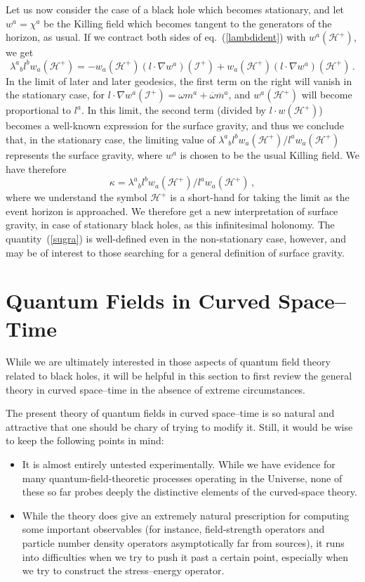 \documentclass[
%
draft    %
,numberedheadings 
,bibliocites
  ]
  {aipproc}
\newcommand{\scrif}{{{\mathscr I}^{+}}}
\newcommand{\Hf}{{{\mathscr H}^{+}}} %
\begin{document}
Let us now consider the case of a black hole which becomes stationary, and let $w^a=\chi ^a$ be the
Killing field which becomes tangent to the generators of the horizon, as usual.  If we contract both sides of eq.~(\ref{lambdident}) with $w^a(\Hf )$, we get
\begin{equation}\label{sugra}
 \lambda ^a{}_bl^bw_a(\Hf )=-w_a(\Hf )(l\cdot \nabla w^a )(\scrif ) 
  +w_a(\Hf )(l\cdot \nabla w^a)(\Hf )\, .
\end{equation}
In the limit of later and later geodesics, the first term on the right will vanish in the stationary case, for $l\cdot\nabla w^a (\scrif ) =\omega m^a+\overline\omega {\overline m}^a$, and $w^a(\Hf )$ will become proportional to $l^a$.  In this limit, the second term (divided by $l\cdot w(\Hf )$) becomes a well-known expression for the surface gravity, and thus we conclude that, in the stationary case, the limiting value of $ \lambda ^a{}_bl^bw_a(\Hf ) /l^aw_a(\Hf )$ represents the surface gravity, where $w^a$ is chosen to be the usual Killing field.  We have therefore
\begin{equation}
\kappa =\lambda ^a{}_bl^bw_a(\Hf )/l^aw_a(\Hf )\, ,
\end{equation}
where we understand the symbol $\Hf$ is a short-hand for taking the limit as the event horizon is approached.
We therefore get a new interpretation of surface gravity, in case of stationary black holes, as this infinitesimal holonomy.  The quantity~(\ref{sugra}) is well-defined even in the non-stationary case, however, and may be of interest to those searching for a general definition of surface gravity.


\section{Quantum Fields in Curved Space--Time}

While we are ultimately interested in those aspects of quantum field theory  related to black holes, it will be helpful in this section to first review the general theory in curved space--time in the absence of extreme circumstances. 

The present theory of quantum fields in curved space--time is so natural and attractive that one should be chary of trying to modify it.  Still, it would be wise to keep the following points in mind:

\begin{itemize}

\item
It is almost entirely untested experimentally.  While we have evidence for many
quantum-field-theoretic processes operating in the Universe, none of these so far probes deeply the distinctive elements of the curved-space theory.

\item
While the theory does give an extremely natural prescription for computing some important observables (for instance, field-strength operators and particle number density operators asymptotically far from sources), it
runs into difficulties when we try to push it past a certain point, especially when we try to construct the stress--energy operator.  
\end{itemize}
\end{document}
